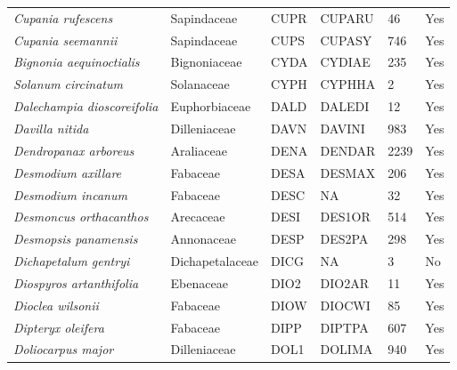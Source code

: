 \documentclass[11pt]{article}
\begin{document}
\begin{longtable}{@{}llllll@{}}
\textit{Cupania rufescens}                            & Sapindaceae      & CUPR   & CUPARU & 46              & Yes       \\
\textit{Cupania seemannii}                            & Sapindaceae      & CUPS   & CUPASY & 746             & Yes       \\
\textit{Bignonia aequinoctialis}                      & Bignoniaceae     & CYDA   & CYDIAE & 235             & Yes       \\
\textit{Solanum circinatum}                           & Solanaceae       & CYPH   & CYPHHA & 2               & Yes       \\
\textit{Dalechampia dioscoreifolia}                   & Euphorbiaceae    & DALD   & DALEDI & 12              & Yes       \\
\textit{Davilla nitida}                               & Dilleniaceae     & DAVN   & DAVINI & 983             & Yes       \\
\textit{Dendropanax arboreus}                         & Araliaceae       & DENA   & DENDAR & 2239            & Yes       \\
\textit{Desmodium axillare}                           & Fabaceae         & DESA   & DESMAX & 206             & Yes       \\
\textit{Desmodium incanum}                            & Fabaceae         & DESC   & NA     & 32              & Yes       \\
\textit{Desmoncus orthacanthos}                       & Arecaceae        & DESI   & DES1OR & 514             & Yes       \\
\textit{Desmopsis panamensis}                         & Annonaceae       & DESP   & DES2PA & 298             & Yes       \\
\textit{Dichapetalum gentryi}                         & Dichapetalaceae  & DICG   & NA     & 3               & No        \\
\textit{Diospyros artanthifolia}                      & Ebenaceae        & DIO2   & DIO2AR & 11              & Yes       \\
\textit{Dioclea wilsonii}                             & Fabaceae         & DIOW   & DIOCWI & 85              & Yes       \\
\textit{Dipteryx oleifera}                            & Fabaceae         & DIPP   & DIPTPA & 607             & Yes       \\
\textit{Doliocarpus major}                            & Dilleniaceae     & DOL1   & DOLIMA & 940             & Yes       \\

\end{longtable}
\end{document}
